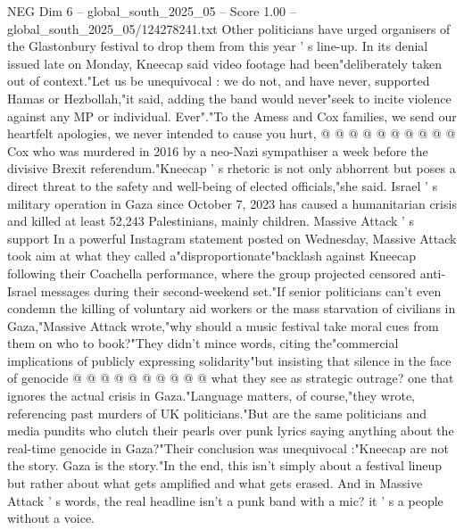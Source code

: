 \begin{textsample}{NEG Dim 6 – global\_south\_2025\_05 – Score 1.00 – global\_south\_2025\_05/124278241.txt}
Other politicians have urged organisers of the Glastonbury festival to drop them from this year ' s line-up.
In its denial issued late on Monday, Kneecap said video footage had been"deliberately taken out of context."Let us be unequivocal : we do not, and have never, supported Hamas or Hezbollah,"it said, adding the band would never"seek to incite violence against any MP or individual.
Ever"."To the Amess and Cox families, we send our heartfelt apologies, we never intended to cause you hurt, @ @ @ @ @ @ @ @ @ @ Cox who was murdered in 2016 by a neo-Nazi sympathiser a week before the divisive Brexit referendum."Kneecap ' s rhetoric is not only abhorrent but poses a direct threat to the safety and well-being of elected officials,"she said.
Israel ' s military operation in Gaza since October 7, 2023 has caused a humanitarian crisis and killed at least 52,243 Palestinians, mainly children.
Massive Attack ' s support In a powerful Instagram statement posted on Wednesday, Massive Attack took aim at what they called a"disproportionate"backlash against Kneecap following their Coachella performance, where the group projected censored anti-Israel messages during their second-weekend set."If senior politicians can't even condemn the killing of voluntary aid workers or the mass starvation of civilians in Gaza,"Massive Attack wrote,"why should a music festival take moral cues from them on who to book?"They didn't mince words, citing the"commercial implications of publicly expressing solidarity"but insisting that silence in the face of genocide @ @ @ @ @ @ @ @ @ @ what they see as strategic outrage? one that ignores the actual crisis in Gaza."Language matters, of course,"they wrote, referencing past murders of UK politicians."But are the same politicians and media pundits who clutch their pearls over punk lyrics saying anything about the real-time genocide in Gaza?"Their conclusion was unequivocal :"Kneecap are not the story.
Gaza is the story."In the end, this isn't simply about a festival lineup but rather about what gets amplified and what gets erased.
And in Massive Attack ' s words, the real headline isn't a punk band with a mic? it ' s a people without a voice.

\end{textsample}
